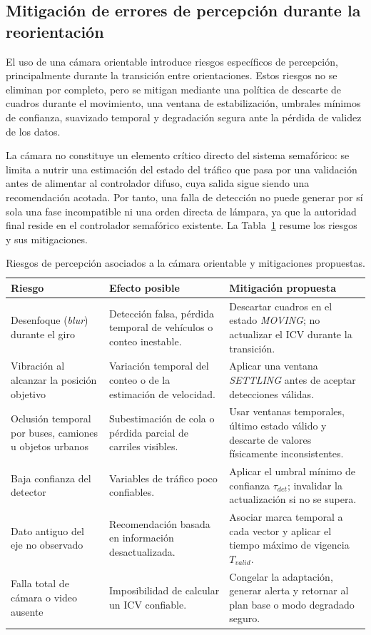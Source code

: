 \subsection{Mitigación de errores de percepción durante la reorientación}\label{subsec:mitigacion-percepcion}

El uso de una cámara orientable introduce riesgos específicos de percepción, principalmente durante la
transición entre orientaciones. Estos riesgos no se eliminan por completo, pero se mitigan mediante una
política de descarte de cuadros durante el movimiento, una ventana de estabilización, umbrales mínimos de
confianza, suavizado temporal y degradación segura ante la pérdida de validez de los datos.

La cámara no constituye un elemento crítico directo del sistema semafórico: se limita a nutrir una
estimación del estado del tráfico que pasa por una validación antes de alimentar al controlador difuso, cuya
salida sigue siendo una recomendación acotada. Por tanto, una falla de detección no puede generar por sí sola una
fase incompatible ni una orden directa de lámpara, ya que la autoridad final reside en el controlador
semafórico existente. La Tabla~\ref{tab:riesgos-percepcion} resume los riesgos y sus mitigaciones.

\begin{table}[H]
  \centering
  \footnotesize
  \caption{Riesgos de percepción asociados a la cámara orientable y mitigaciones propuestas.}
  \label{tab:riesgos-percepcion}
  \begin{tabularx}{\linewidth}{@{}>{\raggedright\arraybackslash}p{3.4cm}XX@{}}
    \toprule
    \textbf{Riesgo} & \textbf{Efecto posible} & \textbf{Mitigación propuesta}\\
    \midrule
    Desenfoque (\emph{blur}) durante el giro & Detección falsa, pérdida temporal de vehículos o conteo inestable. & Descartar cuadros en el estado \textit{MOVING}; no actualizar el ICV durante la transición.\\
    Vibración al alcanzar la posición objetivo & Variación temporal del conteo o de la estimación de velocidad. & Aplicar una ventana \textit{SETTLING} antes de aceptar detecciones válidas.\\
    Oclusión temporal por buses, camiones u objetos urbanos & Subestimación de cola o pérdida parcial de carriles visibles. & Usar ventanas temporales, último estado válido y descarte de valores físicamente inconsistentes.\\
    Baja confianza del detector & Variables de tráfico poco confiables. & Aplicar el umbral mínimo de confianza $\tau_{det}$; invalidar la actualización si no se supera.\\
    Dato antiguo del eje no observado & Recomendación basada en información desactualizada. & Asociar marca temporal a cada vector y aplicar el tiempo máximo de vigencia $T_{valid}$.\\
    Falla total de cámara o video ausente & Imposibilidad de calcular un ICV confiable. & Congelar la adaptación, generar alerta y retornar al plan base o modo degradado seguro.\\
    \bottomrule
  \end{tabularx}
\end{table}

